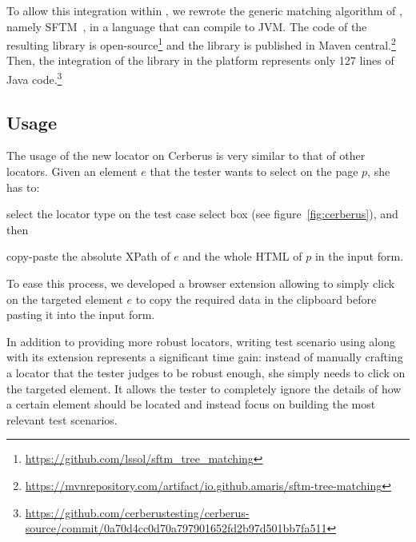 
To allow this integration within \cerberus, we rewrote the generic matching algorithm of \erratum, namely SFTM~\cite{brisset2020sftm}, in a language that can compile to JVM.
The code of the resulting library is open-source\footnote{\url{https://github.com/lssol/sftm\_tree\_matching}} and the library is published in Maven central.\footnote{\url{https://mvnrepository.com/artifact/io.github.amaris/sftm-tree-matching}}
Then, the integration of the \erratum library in the \cerberus platform represents only 127 lines of Java code.\footnote{\url{https://github.com/cerberustesting/cerberus-source/commit/0a70d4cc0d70a797901652fd2b97d501bb7fa511}}

\subsection{Usage}
The usage of the new \erratum locator on Cerberus is very similar to that of other locators.
Given an element $e$ that the tester wants to select on the page $p$, she has to:
\begin{compactenum}
\item select the \erratum locator type on the test case select box (see figure~\ref{fig:cerberus}), and then
\item copy-paste the absolute XPath of $e$ and the whole HTML of $p$ in the input form.
\end{compactenum}
To ease this process, we developed a browser extension allowing to simply click on the targeted element $e$ to copy the required data in the clipboard before pasting it into the input form.

In addition to providing more robust locators, writing test scenario using \erratum along with its extension represents a significant time gain: instead of manually crafting a locator that the tester judges to be robust enough, she simply needs to click on the targeted element. 
It allows the tester to completely ignore the details of how a certain element should be located and instead focus on building the most relevant test scenarios.

